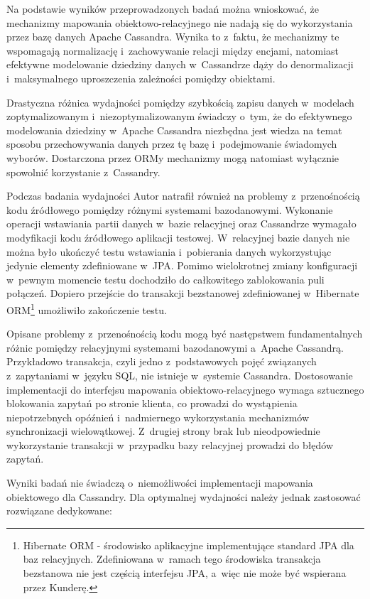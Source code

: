 Na podstawie wyników przeprowadzonych badań można wnioskować, że mechanizmy mapowania obiektowo-relacyjnego nie nadają się do wykorzystania przez bazę danych Apache Cassandra. Wynika to z~faktu, że mechanizmy te wspomagają normalizację i~zachowywanie relacji między encjami, natomiast efektywne modelowanie dziedziny danych w~Cassandrze dąży do denormalizacji i~maksymalnego uproszczenia zależności pomiędzy obiektami.

Drastyczna różnica wydajności pomiędzy szybkością zapisu danych w~modelach zoptymalizowanym i~niezoptymalizowanym świadczy o~tym, że do efektywnego modelowania dziedziny w~Apache Cassandra niezbędna jest wiedza na temat sposobu przechowywania danych przez tę bazę i~podejmowanie świadomych wyborów. Dostarczona przez ORMy mechanizmy mogą natomiast wyłącznie spowolnić korzystanie z~Cassandry.

Podczas badania wydajności Autor natrafił również na problemy z~przenośnością kodu źródłowego pomiędzy różnymi systemami bazodanowymi. Wykonanie operacji wstawiania partii danych w~bazie relacyjnej oraz Cassandrze wymagało modyfikacji kodu źródłowego aplikacji testowej. W~relacyjnej bazie danych nie można było ukończyć testu wstawiania i~pobierania danych wykorzystując jedynie elementy zdefiniowane w~JPA. Pomimo wielokrotnej zmiany konfiguracji w~pewnym momencie testu dochodziło do całkowitego zablokowania puli połączeń. Dopiero przejście do transakcji bezstanowej zdefiniowanej w~Hibernate ORM\footnote{Hibernate ORM - środowisko aplikacyjne implementujące standard JPA dla baz relacyjnych. Zdefiniowana w~ramach tego środowiska transakcja bezstanowa nie jest częścią interfejsu JPA, a~więc nie może być wspierana przez Kunderę.} umożliwiło zakończenie testu.

Opisane problemy z~przenośnością kodu mogą być następstwem fundamentalnych różnic pomiędzy relacyjnymi systemami bazodanowymi a~Apache Cassandrą. Przykładowo transakcja, czyli jedno z~podstawowych pojęć związanych z~zapytaniami w~języku SQL, nie istnieje w~systemie Cassandra. Dostosowanie implementacji do interfejsu mapowania obiektowo-relacyjnego wymaga sztucznego blokowania zapytań po stronie klienta, co prowadzi do wystąpienia niepotrzebnych opóźnień i~nadmiernego wykorzystania mechanizmów synchronizacji wielowątkowej. Z~drugiej strony brak lub nieodpowiednie wykorzystanie transakcji w~przypadku bazy relacyjnej prowadzi do błędów zapytań. 

Wyniki badań nie świadczą o~niemożliwości implementacji mapowania obiektowego dla Cassandry. Dla optymalnej wydajności należy jednak zastosować rozwiązane dedykowane:

